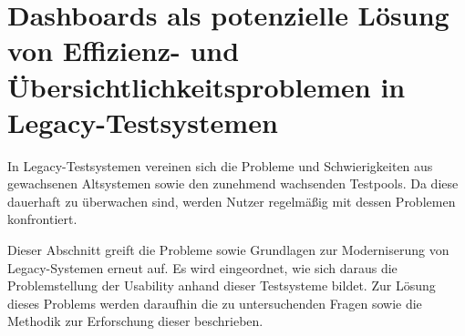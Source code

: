 \chapter{Dashboards als potenzielle Lösung von Effizienz- und Übersichtlichkeitsproblemen in Legacy-Testsystemen}
\label{ch:Problemstellung}

In Legacy-Testsystemen vereinen sich die Probleme und Schwierigkeiten aus gewachsenen Altsystemen sowie den zunehmend wachsenden Testpools. Da diese dauerhaft zu überwachen sind, werden Nutzer regelmäßig mit dessen Problemen konfrontiert.

Dieser Abschnitt greift die Probleme sowie Grundlagen zur Moderniserung von Legacy-Systemen erneut auf. Es wird eingeordnet, wie sich daraus die Problemstellung der Usability anhand dieser Testsysteme bildet.
Zur Lösung dieses Problems werden daraufhin die zu untersuchenden Fragen sowie die Methodik zur Erforschung dieser beschrieben.






